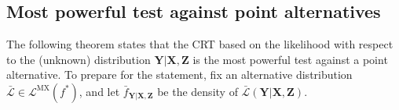 \documentclass[12pt]{article}
\theoremstyle{definition}
\theoremstyle{remark}
\newcommand{\prx}{\bm X}
\newcommand{\srx}{X}
\newcommand{\sfx}{x}
\newcommand{\prz}{\bm Z}
\newcommand{\srz}{Z}
\newcommand{\sfz}{z}
\newcommand{\pry}{{\bm Y}}
\newcommand{\sry}{Y}
\newcommand{\sfy}{y}
\begin{document}
%
%
%

\subsection{Most powerful test against point alternatives} \label{sec:NP}

The following theorem states that the CRT based on the likelihood with respect to the (unknown) distribution $\pry|\prx, \prz$ is the most powerful test against a point alternative. To prepare for the statement, fix an alternative distribution $\bar{\mathcal L} \in \mathscr L^{\text{MX}}(f^*)$, and let $\bar f_{\pry|\prx, \prz}$ be the density of $\bar{\mathcal L}(\pry|\prx, \prz)$. %
\end{document}
